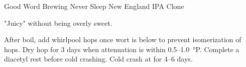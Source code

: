 \begin{recipe}{Good Word Brewing Never Sleep New England IPA Clone}

\begin{aboutblock}
"Juicy" without being overly sweet. \sourceaha
\end{aboutblock}


\begin{methodandtiming}
 
\begin{mashsteps}
\end{mashsteps}

\begin{fermentationsteps}
\end{fermentationsteps}

\begin{directions}
After boil, add whirlpool hops once wort is below  to prevent 
isomerization of hops. Dry hop for 3 days when attenuation is within
0.5--1.0~°P. Complete a diacetyl rest before cold crashing. Cold crash at
 for 4--6 days.
\end{directions}

\end{methodandtiming}

\recipebreak

\begin{ingredientsblock}

\begin{malts}
\end{malts}

\begin{hops}
\end{hops}


\end{ingredientsblock}

\end{recipe}

